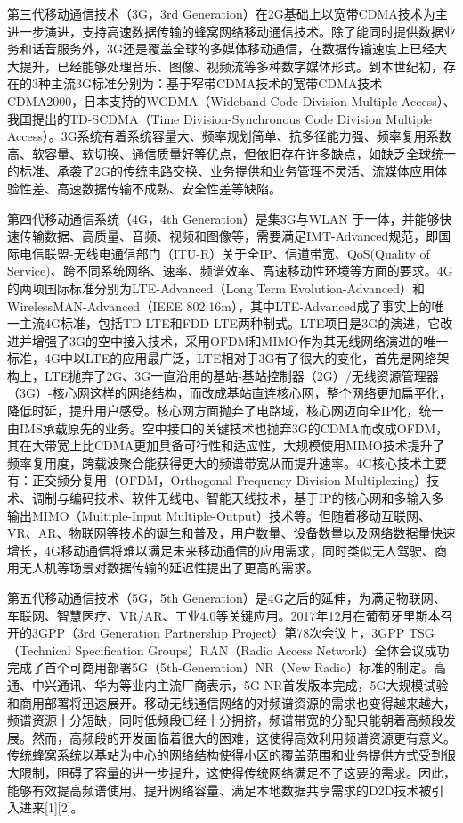 \documentclass[figurelist,tablelist,algorithmlist,nomlist,masters]{seuthesix}
\begin{document}
	第三代移动通信技术（3G，3rd Generation）在2G基础上以宽带CDMA技术为主进一步演进，支持高速数据传输的蜂窝网络移动通信技术。除了能同时提供数据业务和话音服务外，3G还是覆盖全球的多媒体移动通信，在数据传输速度上已经大大提升，已经能够处理音乐、图像、视频流等多种数字媒体形式。到本世纪初，存在的3种主流3G标准分别为：基于窄带CDMA技术的宽带CDMA技术CDMA2000，日本支持的WCDMA（Wideband Code Division Multiple Access）、我国提出的TD-SCDMA（Time Division-Synchronous Code Division Multiple Access）。3G系统有着系统容量大、频率规划简单、抗多径能力强、频率复用系数高、软容量、软切换、通信质量好等优点，但依旧存在许多缺点，如缺乏全球统一的标准、承袭了2G的传统电路交换、业务提供和业务管理不灵活、流媒体应用体验性差、高速数据传输不成熟、安全性差等缺陷。
	
	第四代移动通信系统（4G，4th Generation）是集3G与WLAN 于一体，并能够快速传输数据、高质量、音频、视频和图像等，需要满足IMT-Advanced规范，即国际电信联盟-无线电通信部门（ITU-R）关于全IP、信道带宽、QoS(Quality of Service)、跨不同系统网络、速率、频谱效率、高速移动性环境等方面的要求。4G的两项国际标准分别为LTE-Advanced（Long Term Evolution-Advanced）和WirelessMAN-Advanced（IEEE 802.16m），其中LTE-Advanced成了事实上的唯一主流4G标准，包括TD-LTE和FDD-LTE两种制式。LTE项目是3G的演进，它改进并增强了3G的空中接入技术，采用OFDM和MIMO作为其无线网络演进的唯一标准，4G中以LTE的应用最广泛，LTE相对于3G有了很大的变化，首先是网络架构上，LTE抛弃了2G、3G一直沿用的基站-基站控制器（2G）/无线资源管理器（3G）-核心网这样的网络结构，而改成基站直连核心网，整个网络更加扁平化，降低时延，提升用户感受。核心网方面抛弃了电路域，核心网迈向全IP化，统一由IMS承载原先的业务。空中接口的关键技术也抛弃3G的CDMA而改成OFDM，其在大带宽上比CDMA更加具备可行性和适应性，大规模使用MIMO技术提升了频率复用度，跨载波聚合能获得更大的频谱带宽从而提升速率。4G核心技术主要有：正交频分复用（OFDM，Orthogonal Frequency Division Multiplexing）技术、调制与编码技术、软件无线电、智能天线技术，基于IP的核心网和多输入多输出MIMO（Multiple-Input Multiple-Output）技术等。但随着移动互联网、VR、AR、物联网等技术的诞生和普及，用户数量、设备数量以及网络数据量快速增长，4G移动通信将难以满足未来移动通信的应用需求，同时类似无人驾驶、商用无人机等场景对数据传输的延迟性提出了更高的需求。
	
	第五代移动通信技术（5G，5th Generation）是4G之后的延伸，为满足物联网、车联网、智慧医疗、VR/AR、工业4.0等关键应用。2017年12月在葡萄牙里斯本召开的3GPP（3rd Generation Partnership Project）第78次会议上，3GPP TSG（Technical Specification Groups）RAN（Radio Access Network）全体会议成功完成了首个可商用部署5G（5th-Generation）NR（New Radio）标准的制定。高通、中兴通讯、华为等业内主流厂商表示，5G NR首发版本完成，5G大规模试验和商用部署将迅速展开。移动无线通信网络的对频谱资源的需求也变得越来越大，频谱资源十分短缺，同时低频段已经十分拥挤，频谱带宽的分配只能朝着高频段发展。然而，高频段的开发面临着很大的困难，这使得高效利用频谱资源更有意义。传统蜂窝系统以基站为中心的网络结构使得小区的覆盖范围和业务提供方式受到很大限制，阻碍了容量的进一步提升，这使得传统网络满足不了这要的需求。因此，能够有效提高频谱使用、提升网络容量、满足本地数据共享需求的D2D技术被引入进来[1][2]。
	
\end{document}
